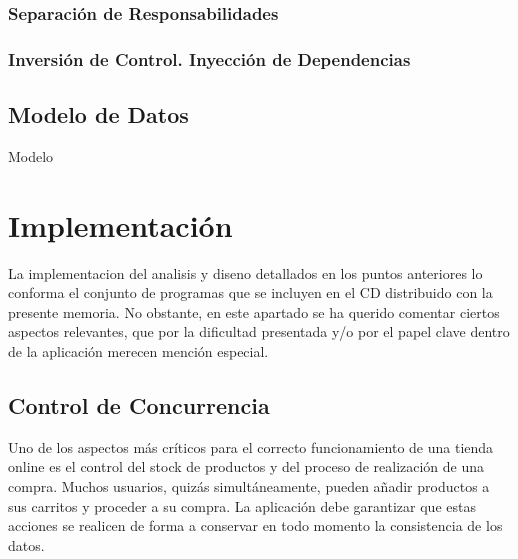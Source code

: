 \documentclass[a4paper]{report}
\begin{document}
    \subsubsection{Separación de Responsabilidades}
    \subsubsection{Inversión de Control. Inyección de Dependencias}
    
    \subsection{Modelo de Datos}
    Modelo

    \section{Implementación}
    La implementacion del analisis y diseno detallados en los puntos anteriores lo conforma el conjunto de programas que se incluyen en el CD distribuido con la presente memoria. No obstante, en este apartado se ha querido comentar ciertos aspectos relevantes, que por la dificultad presentada y/o por el papel clave dentro de la aplicación merecen mención especial.
    
    \subsection{Control de Concurrencia}
    Uno de los aspectos más críticos para el correcto funcionamiento de una tienda online es el control del stock de productos y del proceso de realización de una compra. Muchos usuarios, quizás simultáneamente, pueden añadir productos a sus carritos y proceder a su compra. La aplicación debe garantizar que estas acciones se realicen de forma a conservar en todo momento la consistencia de los datos.
    \\
    
\end{document}
